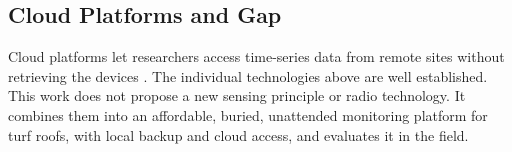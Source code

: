 \subsection{Cloud Platforms and Gap}
Cloud platforms let researchers access time-series data from remote sites without retrieving the devices \cite{naik2017cloud,sheffield2022cloud}. The individual technologies above are well established. This work does not propose a new sensing principle or radio technology. It combines them into an affordable, buried, unattended monitoring platform for turf roofs, with local backup and cloud access, and evaluates it in the field.
